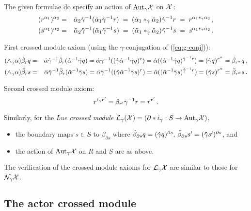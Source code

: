 \noindent 
The given formulae do specify an action of $\mathrm{Aut}_{\gamma}\mathcal{X}$ on $\mathcal{X}$\,: 
\begin{eqnarray*}
(r^{\alpha_1})^{\alpha_2} 
& = & \dot{\alpha}_2 \dot{\gamma}^{-1} (\dot{\alpha}_1 \dot{\gamma}^{-1} r)
\;=\; (\dot{\alpha}_1 \ast_{\dot{\gamma}} \dot{\alpha}_2) \dot{\gamma}^{-1} r
\;=\; r^{\alpha_1 \ast_{\gamma} \alpha_2}\,, \\ 
(s^{\alpha_1})^{\alpha_2} 
& = & \ddot{\alpha}_2 \ddot{\gamma}^{-1} (\ddot{\alpha}_1 \ddot{\gamma}^{-1} s)
\;=\; (\ddot{\alpha}_1 \ast_{\ddot{\gamma}} \ddot{\alpha}_2) \ddot{\gamma}^{-1} s
\;=\; s^{\alpha_1 \ast_{\gamma} \dot{\alpha}_2}\,.  
\end{eqnarray*} 

\noindent 
First crossed module axiom 
(using the $\gamma$-conjugation of (\ref{eq:g-conj})): 
\begin{eqnarray*} 
(\wedge_{\gamma} \alpha)\dot{\beta}_r q 
 &=& \dot{\alpha}\dot{\gamma}^{-1}\dot{\beta}_r(\dot{\alpha}^{-1}\dot{\gamma} q) 
  =  \dot{\alpha}\dot{\gamma}^{-1} ((\dot{\gamma}\dot{\alpha}^{-1}\dot{\gamma} q)^r) 
  =  \dot{\alpha} ((\dot{\alpha}^{-1}\dot{\gamma} q)^{\dot{\gamma}^{-1}r}) 
  =  (\dot{\gamma} q)^{r^{\alpha}}  
  =  \dot{\beta}_{r^{\alpha}} q\,, \\
(\wedge_{\gamma} \alpha)\ddot{\beta}_r s 
 &=& \ddot{\alpha}\ddot{\gamma}^{-1}\ddot{\beta}_r(\ddot{\alpha}^{-1}\ddot{\gamma} s) 
  =  \ddot{\alpha}\ddot{\gamma}^{-1} ((\ddot{\gamma}\ddot{\alpha}^{-1}\ddot{\gamma} s)^r) 
  =  \ddot{\alpha} ((\ddot{\alpha}^{-1}\ddot{\gamma} s)^{\dot{\gamma}^{-1}r}) 
  =  (\ddot{\gamma} s)^{r^{\alpha}}  
  =  \ddot{\beta}_{r^{\alpha}} s\,. 
\end{eqnarray*}

\noindent 
Second crossed module axiom: 
$$
r^{\dot{\iota}_{\gamma} r'} 
 = \dot{\beta}_{r'} \dot{\gamma}^{-1}r 
 = r^{r'}\,.
$$

\medskip\noindent 
Similarly, for the \emph{Lue crossed module} 
$\mathcal{L}_{\gamma}(\mathcal{X}) = (\partial*\dot{\iota}_{\gamma} : S \to \mathrm{Aut}_{\gamma}\mathcal{X})$, 
\begin{itemize} 
\item
the boundary maps $s \in S$ to $\beta_{\partial s}$ where 
$\dot{\beta}_{\partial s}q = (\dot{\gamma} q)^{\partial s},\, 
\ddot{\beta}_{\partial s}s' = (\ddot{\gamma} s')^{\partial s}$,  and 
\item
the action of $\mathrm{Aut}_{\gamma}\mathcal{X}$ on $R$ and $S$ are as above. 
\end{itemize} 
The verification of the crossed module axioms for $\mathcal{L}_{\gamma}\mathcal{X}$ 
are similar to those for $\mathcal{N}_{\gamma}\mathcal{X}$. 



\subsection{The actor crossed module}  
\label{subs:AX}


